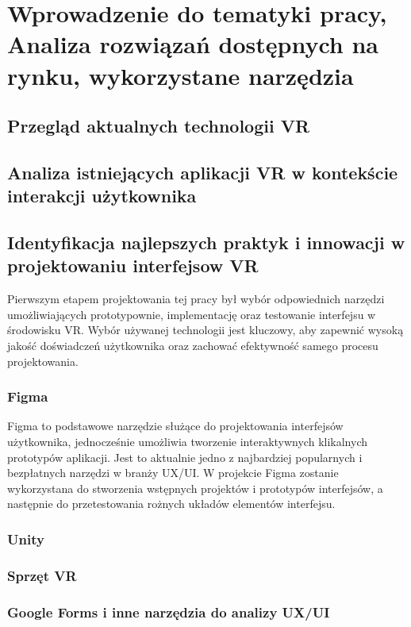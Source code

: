 \chapter{Wprowadzenie do tematyki pracy, Analiza rozwiązań dostępnych na rynku, wykorzystane narzędzia}

\section {Przegląd aktualnych technologii VR}
\section {Analiza istniejących aplikacji VR w kontekście interakcji użytkownika}
\section {Identyfikacja najlepszych praktyk i innowacji w projektowaniu interfejsow VR}

Pierwszym etapem projektowania tej pracy był wybór odpowiednich narzędzi umożliwiających prototypownie, implementację oraz testowanie interfejsu w środowisku VR. Wybór używanej technologii jest kluczowy, aby zapewnić wysoką jakość doświadczeń użytkownika oraz zachować efektywność samego procesu projektowania.

\subsection{Figma}
Figma to podstawowe narzędzie służące do projektowania interfejsów użytkownika, jednocześnie umożliwia tworzenie interaktywnych klikalnych prototypów aplikacji. Jest to aktualnie jedno z najbardziej popularnych i bezpłatnych narzędzi w branży UX/UI. W projekcie Figma zostanie wykorzystana do stworzenia wstępnych projektów i prototypów interfejsów, a następnie do przetestowania rożnych układów elementów interfejsu. 
\subsection{Unity}
\subsection{Sprzęt VR}
\subsection{Google Forms i inne narzędzia do analizy UX/UI}








